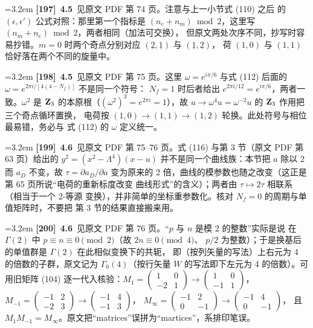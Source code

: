 \par
\par\medskip\noindent\hangindent=3.2em \textbf{[197]}~\textbf{4.5}~见原文 PDF 第 74 页。注意与上一小节式 (110) 之后 的 $(\epsilon,\epsilon')$ 公式对照：那里第一个指标是 $(n_e+n_m)\bmod2$，这里写 $(n_m+n_e)\bmod2$，两者相同（加法可交换）， 但原文两处次序不同，抄写时容易抄错。$m=0$ 时两个奇点分别对应 $(\underline{2},\underline{1})$ 与 $(\underline{1},\underline{2})$， 荷 $(1,0)$ 与 $(1,1)$ 恰好落在两个不同的旋量中。
\par
\par\medskip\noindent\hangindent=3.2em \textbf{[198]}~\textbf{4.5}~见原文 PDF 第 75 页。这里 $\omega=e^{i\pi/6}$ 与式 (112) 后面的 $\omega=e^{2\pi i/[4(4-N_f)]}$ 不是同一个符号： $N_f=1$ 时后者给出 $e^{2\pi i/12}=e^{i\pi/6}$，两者一致。$\omega^2$ 是 ${\bf Z}_3$ 的本原根（$(\omega^2)^3=e^{2\pi i}=1$），故 $u\to\omega^4u=\omega^{-2}u$ 的 ${\bf Z}_3$ 作用把三个奇点循环置换， 电荷按 $(1,0)\to(1,1)\to(1,2)$ 轮换。此处符号与相位最易错，务必与 式 (112) 的 $\omega$ 定义统一。
\par
\par\medskip\noindent\hangindent=3.2em \textbf{[199]}~\textbf{4.6}~见原文 PDF 第 75--76 页。式 (116) 与第 3 节（原文 PDF 第 63 页）给出的 $y^2=(x^2-\Lambda^4)(x-u)$ 并不是同一个曲线族：本节把 $a$ 除以 2 而 $a_D$ 不变，故 $\tau=\partial a_D/\partial a$ 变为原来的 2 倍，曲线的模参数也随之改变（这正是第 65 页所说“电荷的重新标度改变 曲线形式”的含义）；两者由 $\tau\mapsto2\tau$ 相联系（相当于一个 2-等源 变换），并非简单的坐标重参数化。核对 $N_f=0$ 的周期与单值矩阵时，不要把 第 3 节的结果直接搬来用。
\par
\par\medskip\noindent\hangindent=3.2em \textbf{[200]}~\textbf{4.6}~见原文 PDF 第 76 页。“$p$ 与 $n$ 是模 2 的整数”实际是说 在 $\Gamma(2)$ 中 $p\equiv n\equiv0\pmod2$（故 $2n\equiv0\pmod4$、 $p/2$ 为整数）；于是换基后的单值群是 $\Gamma(2)$ 在此相似变换下的共轭， 即（按列矢量的写法）上右元为 4 的倍数的子群，原文记为 $\Gamma_0(4)$（按行矢量 $W$ 的写法即下左元为 4 的倍数）。可用旧矩阵 (104) 逐一代入核验：$M_1=\left(\begin{smallmatrix}1&0\\-2&1\end{smallmatrix}\right) \to\left(\begin{smallmatrix}1&0\\-1&1\end{smallmatrix}\right)$， $M_{-1}=\left(\begin{smallmatrix}-1&2\\-2&3\end{smallmatrix}\right) \to\left(\begin{smallmatrix}-1&4\\-1&3\end{smallmatrix}\right)$， $M_\infty=\left(\begin{smallmatrix}-1&2\\0&-1\end{smallmatrix}\right) \to\left(\begin{smallmatrix}-1&4\\0&-1\end{smallmatrix}\right)$， 且 $M_1M_{-1}=M_\infty$。原文把“matrices”误拼为“martices”，系排印笔误。

